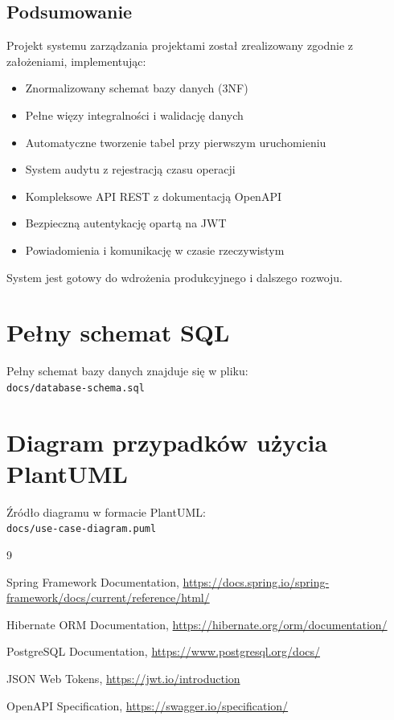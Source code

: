 \documentclass[12pt,a4paper]{report}
\begin{document}
\section{Podsumowanie}

Projekt systemu zarządzania projektami został zrealizowany zgodnie z założeniami, implementując:

\begin{itemize}
    \item Znormalizowany schemat bazy danych (3NF)
    \item Pełne więzy integralności i walidację danych
    \item Automatyczne tworzenie tabel przy pierwszym uruchomieniu
    \item System audytu z rejestracją czasu operacji
    \item Kompleksowe API REST z dokumentacją OpenAPI
    \item Bezpieczną autentykację opartą na JWT
    \item Powiadomienia i komunikację w czasie rzeczywistym
\end{itemize}

System jest gotowy do wdrożenia produkcyjnego i dalszego rozwoju.

\appendix

\chapter{Pełny schemat SQL}

Pełny schemat bazy danych znajduje się w pliku:\\
\texttt{docs/database-schema.sql}

\chapter{Diagram przypadków użycia PlantUML}

Źródło diagramu w formacie PlantUML:\\
\texttt{docs/use-case-diagram.puml}

\begin{thebibliography}{9}

Spring Framework Documentation,
\url{https://docs.spring.io/spring-framework/docs/current/reference/html/}

Hibernate ORM Documentation,
\url{https://hibernate.org/orm/documentation/}

PostgreSQL Documentation,
\url{https://www.postgresql.org/docs/}

JSON Web Tokens,
\url{https://jwt.io/introduction}

OpenAPI Specification,
\url{https://swagger.io/specification/}

\end{thebibliography}
\end{document}
